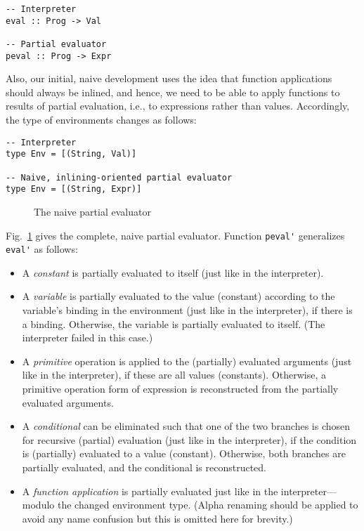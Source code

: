 \documentclass{eptcs}
\begin{document}
\begin{lstlisting}
-- Interpreter
eval :: Prog -> Val

-- Partial evaluator
peval :: Prog -> Expr
\end{lstlisting}

\noindent
Also, our initial, naive development uses the idea that function
applications should always be inlined, and hence, we need to be able
to apply functions to results of partial evaluation, i.e., to
expressions rather than values. Accordingly, the type of environments
changes as follows:

\begin{lstlisting}
-- Interpreter
type Env = [(String, Val)]

-- Naive, inlining-oriented partial evaluator
type Env = [(String, Expr)]
\end{lstlisting}


\begin{figure}
  \caption{The naive partial evaluator}
\label{F:SimplePEval}
\end{figure}

\noindent
Fig.~\ref{F:SimplePEval} gives the complete, naive partial
evaluator. Function \lstinline{peval'} generalizes \lstinline{eval'} as follows:

\begin{itemize}

\item A \emph{constant} is partially evaluated to itself (just like in
  the interpreter).

\item A \emph{variable} is partially evaluated to the value (constant)
  according to the variable's binding in the environment (just like in
  the interpreter), if there is a binding. Otherwise, the variable is
  partially evaluated to itself. (The interpreter failed in this case.)

\item A \emph{primitive} operation is applied to the (partially)
  evaluated arguments (just like in the interpreter), if these are all
  values (constants). Otherwise, a primitive operation form of
  expression is reconstructed from the partially evaluated arguments.

\item A \emph{conditional} can be eliminated such that one of the two
  branches is chosen for recursive (partial) evaluation (just like in
  the interpreter), if the condition is (partially) evaluated to a
  value (constant). Otherwise, both branches are partially evaluated,
  and the conditional is reconstructed.

\item A \emph{function application} is partially evaluated just like
  in the interpreter---modulo the changed environment type. (Alpha
  renaming should be applied to avoid any name confusion but this
  is omitted here for brevity.)

\end{itemize}
\end{document}

